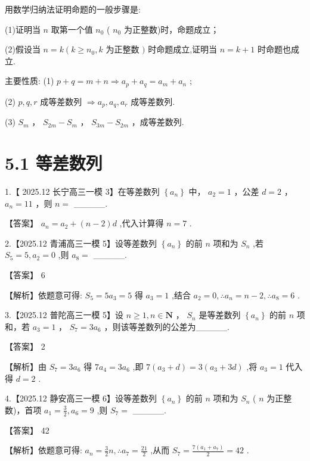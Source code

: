 \documentclass[10pt]{article}
\newcommand*\circled[1]{\tikz[baseline=(char.base)]{\node[shape=circle,draw,inner sep=1.5pt] (char) {\small #1};}}
\begin{document}
 \circled{3} 用数学归纳法证明命题的一般步骤是:

(1)证明当 \(n\) 取第一个值 \({n}_{0}\) ( \({n}_{0}\) 为正整数)时，命题成立；

(2)假设当 \(n = k\left( {k \geq  {n}_{0},k}\right.\) 为正整数 \()\) 时命题成立,证明当 \(n = k + 1\) 时命题也成立.

 \circled{4} 主要性质: (1) \(p + q = m + n \Rightarrow  {a}_{p} + {a}_{q} = {a}_{m} + {a}_{n}\) ;

(2) \(p,q,r\) 成等差数列 \(\Rightarrow  {a}_{p},{a}_{q},{a}_{r}\) 成等差数列.

(3) \({S}_{m}\) ， \({S}_{2m} - {S}_{m}\) ， \({S}_{3m} - {S}_{2m}\) ，成等差数列.

\section*{5.1 等差数列}

1.【 2025.12 长宁高三一模 3】在等差数列 \(\left\{  {a}_{n}\right\}\) 中， \({a}_{2} = 1\) ，公差 \(d = 2\) ， \({a}_{n} = {11}\) ，则 \(n =\) \_\_\_\_\_.

【答案】 \({a}_{n} = {a}_{2} + \left( {n - 2}\right) d\) ,代入计算得 \(n = 7\) .

2.【2025.12 青浦高三一模 5】设等差数列 \(\left\{  {a}_{n}\right\}\) 的前 \(n\) 项和为 \({S}_{n}\) ,若 \({S}_{5} = 5,{a}_{2} = 0\) ,则 \({a}_{8} =\) \_\_\_\_\_.

【答案】 6

【解析】依题意可得: \({S}_{5} = 5{a}_{3} = 5\) 得 \({a}_{3} = 1\) ,结合 \({a}_{2} = 0,\therefore {a}_{n} = n - 2,\therefore {a}_{8} = 6\) .

3.【2025.12 普陀高三一模 5】设 \(n \geq  1,n \in  \mathbf{N}\) ， \({S}_{n}\) 是等差数列 \(\left\{  {a}_{n}\right\}\) 的前 \(n\) 项和，若 \({a}_{3} = 1\) ， \({S}_{7} = 3{a}_{6}\) ，则该等差数列的公差为\_\_\_\_\_.

【答案】 2

【解析】由 \({S}_{7} = 3{a}_{6}\) 得 \(7{a}_{4} = 3{a}_{6}\) ,即 \(7\left( {{a}_{3} + d}\right)  = 3\left( {{a}_{3} + {3d}}\right)\) ,将 \({a}_{3} = 1\) 代入得 \(d = 2\) .

4.【2025.12 静安高三一模 6】设等差数列 \(\left\{  {a}_{n}\right\}\) 的前 \(n\) 项和为 \({S}_{n}\) ( \(n\) 为正整数)，首项 \({a}_{1} = \frac{3}{2},{a}_{6} = 9\) ,则 \({S}_{7} =\) \_\_\_\_\_.

【答案】 42

【解析】依题意可得: \({a}_{n} = \frac{3}{2}n,\therefore {a}_{7} = \frac{21}{2}\) ,从而 \({S}_{7} = \frac{7\left( {{a}_{1} + {a}_{7}}\right) }{2} = {42}\) .
\end{document}
